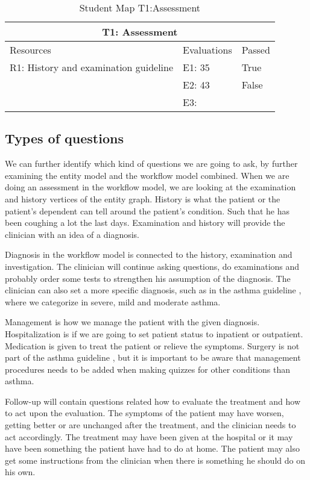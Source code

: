 \begin{table}[h!]
	\begin{tabular}{ | m{12em} | m{8em}| m{5em} | } 
		\hline
		\multicolumn{3}{c}{\bfseries T1: Assessment} \\
		\hline
		Resources & Evaluations & Passed \\
		\hline
		R1: History and examination guideline & E1: 35 & True \\
		& E2: 43 & False \\
		& E3: &  \\
		\hline
	\end{tabular}
	\caption{Student Map T1:Assessment}
	\label{table:StudentMap}
\end{table}

\subsection{Types of questions}
We can further identify which kind of questions we are going to ask, by further examining the entity model and the workflow model combined. When we are doing an assessment in the workflow model, we are looking at the examination and history vertices of the entity graph. History is what the patient or the patient's dependent can tell around the patient's condition. Such that he has been coughing a lot the last days. Examination and history will provide the clinician with an idea of a diagnosis.

Diagnosis in the workflow model is connected to the history, examination and investigation. The clinician will continue asking questions, do examinations and probably order some tests to strengthen his assumption of the diagnosis. The clinician can also set a more specific diagnosis, such as in the asthma guideline \parencite{RepublicofKeny2016}, where we categorize in severe, mild and moderate asthma.

Management is how we manage the patient with the given diagnosis. Hospitalization is if we are going to set patient status to inpatient or outpatient. Medication is given to treat the patient or relieve the symptoms. Surgery is not part of the asthma guideline \parencite{RepublicofKeny2016}, but it is important to be aware that management procedures needs to be added when making quizzes for other conditions than asthma.

Follow-up will contain questions related how to evaluate the treatment and how to act upon the evaluation. The symptoms of the patient may have worsen, getting better or are unchanged after the treatment, and the clinician needs to act accordingly. The treatment may have been given at the hospital or it may have been something the patient have had to do at home. The patient may also get some instructions from the clinician when there is something he should do on his own.


